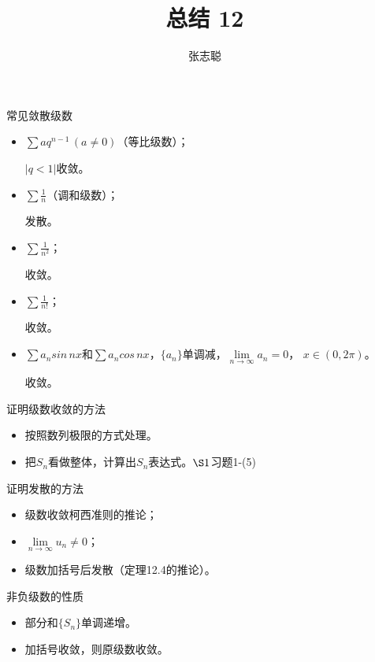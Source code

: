 \documentclass{article}
\begin{document}
\title{总结 12}
\author{张志聪}
\maketitle

\begin{zremark}
  常见敛散级数
\end{zremark}

\begin{itemize}
  \item $\sum a q^{n - 1} \, (a \neq 0)$（等比级数）；

        $|q < 1|$收敛。
  \item $\sum \frac{1}{n}$（调和级数）；

        发散。
  \item $\sum \frac{1}{n^2}$；

        收敛。

  \item $\sum \frac{1}{n!}$；

        收敛。

  \item $\sum a_n sin\, nx$和$\sum a_n cos\, nx$，$\{a_n\}$单调减，$\lim\limits_{n \to \infty} a_n = 0$，
        $x \in (0, 2\pi)$。

        收敛。

\end{itemize}


\begin{zremark}
  证明级数收敛的方法
\end{zremark}

\begin{itemize}
  \item 按照数列极限的方式处理。
  \item 把$S_n$看做整体，计算出$S_n$表达式。$\S 1$习题1-(5)
\end{itemize}

\begin{zremark}
  证明发散的方法
\end{zremark}

\begin{itemize}
  \item 级数收敛柯西准则的推论；
  \item $\lim \limits_{n \to \infty} u_n \neq 0$；
  \item 级数加括号后发散（定理12.4的推论）。
\end{itemize}

\begin{zremark}
  非负级数的性质
\end{zremark}

\begin{itemize}
  \item 部分和$\{S_n\}$单调递增。
  \item 加括号收敛，则原级数收敛。
\end{itemize}
\end{document}
